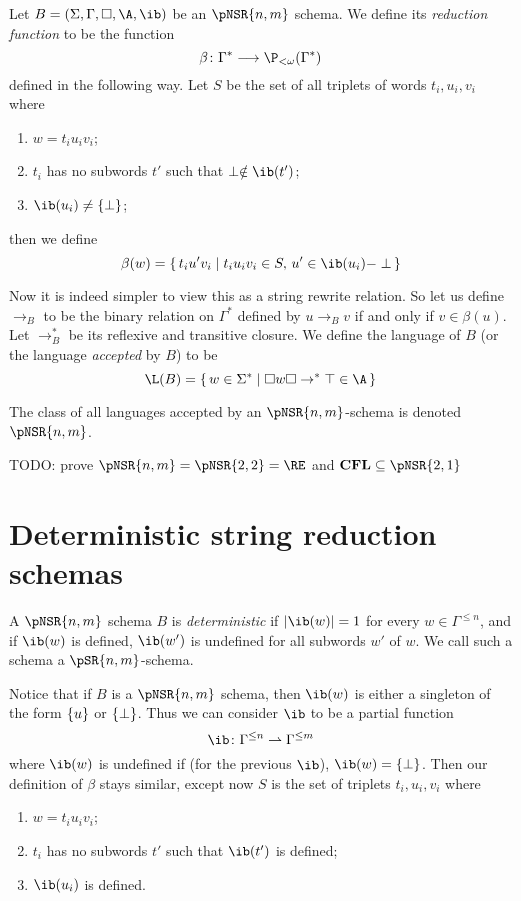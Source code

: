 \documentclass{llncs}
\newcommand{\ari}[1]{{\begin{mdframed}[linecolor=blue]{\color{blue}#1}\end{mdframed}}}
\begin{document}
\begin{definition}

    Let $B=(\Sigma,\Gamma,\square,\A,\ib)$ be an $\pNSR{n,m}$ schema.
    We define its \emph{reduction function} to be the function
    $$ \beta\colon \Gamma^* \longto \P_{<\omega}(\Gamma^*) $$
    defined in the following way.
    Let $S$ be the set of all triplets of words $t_i,u_i,v_i$ where
    \begin{enumerate}
        \item $w=t_iu_iv_i$;
        \item $t_i$ has no subwords $t'$ such that $\perp\notin\ib(t')$;
        \item $\ib(u_i)\neq\set\perp$;
    \end{enumerate}
    then we define
    $$ \beta(w) = \set{t_iu'v_i}[t_iu_iv_i\in S,\,u'\in\ib(u_i)-\perp] $$

    Now it is indeed simpler to view this as a string rewrite relation.
    So let us define $\to_B$ to be the binary relation on $\Gamma^*$ defined by $u\to_Bv$ if and only if $v\in\beta(u)$.
    Let $\to_B^*$ be its reflexive and transitive closure.
    We define the language of $B$ (or the language \emph{accepted} by $B$) to be
    $$ \L(B) = \set{w\in\Sigma^*}[\square w\square\to^*\top\in\A] $$

    The class of all languages accepted by an $\pNSR{n,m}$-schema is denoted $\pNSR{n,m}$.

\end{definition}

\ari{TODO: prove $\pNSR{n,m}=\pNSR{2,2}=\RE$ and $\CFL\subseteq\pNSR{2,1}$}

\section{Deterministic string reduction schemas}

\begin{definition}

    A $\pNSR{n,m}$ schema $B$ is \emph{deterministic} if $\abs{\ib(w)}=1$ for every $w\in\Gamma^{\leq n}$, and if $\ib(w)$ is defined, $\ib(w')$ is undefined for all subwords $w'$ of $w$.
    We call such a schema a $\pSR{n,m}$-schema.

\end{definition}

Notice that if $B$ is a $\pNSR{n,m}$ schema, then $\ib(w)$ is either a singleton of the form $\set u$ or $\set\perp$.
Thus we can consider $\ib$ to be a partial function
$$ \ib\colon\Gamma^{\leq n}\partial\Gamma^{\leq m} $$
where $\ib(w)$ is undefined if (for the previous $\ib$), $\ib(w)=\set\perp$.
Then our definition of $\beta$ stays similar, except now $S$ is the set of triplets $t_i,u_i,v_i$ where
\begin{enumerate}
    \item $w=t_iu_iv_i$;
    \item $t_i$ has no subwords $t'$ such that $\ib(t')$ is defined;
    \item $\ib(u_i)$ is defined.
\end{enumerate}
\end{document}
